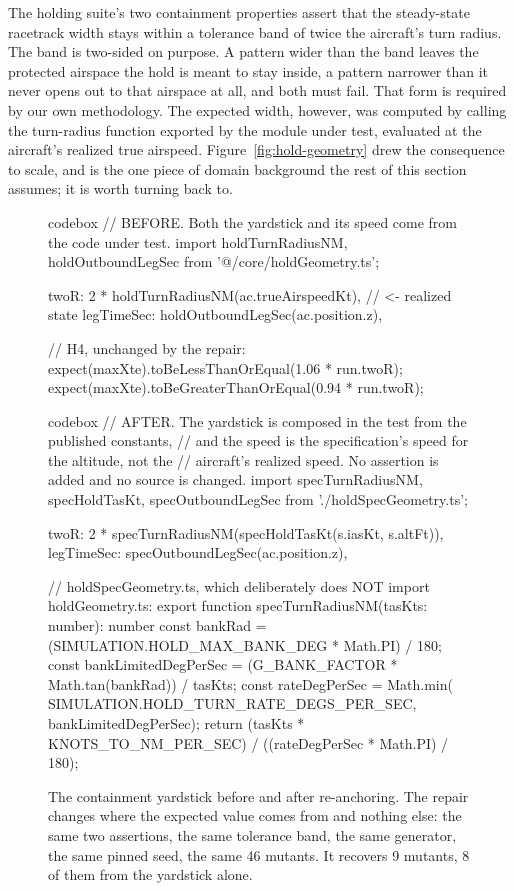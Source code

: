 \documentclass[12pt]{article}
\begin{document}
The holding suite's two containment properties assert that the steady-state
racetrack width stays within a tolerance band of twice the aircraft's turn
radius. The band is two-sided on purpose. A pattern wider than the band leaves
the protected airspace the hold is meant to stay inside, a pattern narrower than
it never opens out to that airspace at all, and both must fail. That form is
required by our own methodology. The expected width, however, was computed by calling the
turn-radius function exported by the module under test, evaluated at the
aircraft's realized true airspeed.
Figure~\ref{fig:hold-geometry} drew the consequence to scale, and is the one piece
of domain background the rest of this section assumes; it is worth turning back to.

\begin{figure}[t]
\begin{tcblisting}{codebox}
// BEFORE. Both the yardstick and its speed come from the code under test.
import { holdTurnRadiusNM, holdOutboundLegSec } from '@/core/holdGeometry.ts';

twoR: 2 * holdTurnRadiusNM(ac.trueAirspeedKt),   // <- realized state
legTimeSec: holdOutboundLegSec(ac.position.z),

// H4, unchanged by the repair:
expect(maxXte).toBeLessThanOrEqual(1.06 * run.twoR);
expect(maxXte).toBeGreaterThanOrEqual(0.94 * run.twoR);
\end{tcblisting}
\begin{tcblisting}{codebox}
// AFTER. The yardstick is composed in the test from the published constants,
// and the speed is the specification's speed for the altitude, not the
// aircraft's realized speed. No assertion is added and no source is changed.
import { specTurnRadiusNM, specHoldTasKt, specOutboundLegSec }
  from './holdSpecGeometry.ts';

twoR: 2 * specTurnRadiusNM(specHoldTasKt(s.iasKt, s.altFt)),
legTimeSec: specOutboundLegSec(ac.position.z),

// holdSpecGeometry.ts, which deliberately does NOT import holdGeometry.ts:
export function specTurnRadiusNM(tasKts: number): number {
  const bankRad = (SIMULATION.HOLD_MAX_BANK_DEG * Math.PI) / 180;
  const bankLimitedDegPerSec = (G_BANK_FACTOR * Math.tan(bankRad)) / tasKts;
  const rateDegPerSec = Math.min(
    SIMULATION.HOLD_TURN_RATE_DEGS_PER_SEC, bankLimitedDegPerSec);
  return (tasKts * KNOTS_TO_NM_PER_SEC) / ((rateDegPerSec * Math.PI) / 180);
}
\end{tcblisting}
\caption{The containment yardstick before and after re-anchoring. The repair
changes where the expected value comes from and nothing else: the same two
assertions, the same tolerance band, the same generator, the same pinned seed,
the same 46 mutants. It recovers 9 mutants, 8 of them from the yardstick alone.}
\label{fig:hold}
\end{figure}
\end{document}

